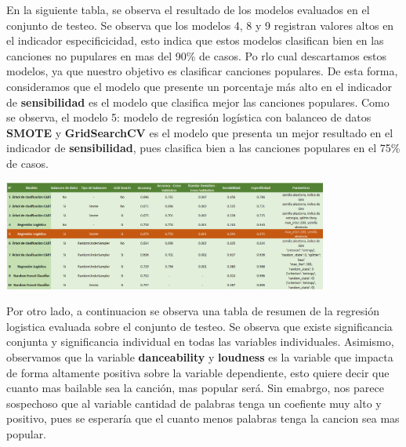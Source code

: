 \documentclass[
  letterpaper,
  DIV=11,
  numbers=noendperiod]{scrartcl}
\begin{document}
En la siguiente tabla, se observa el resultado de los modelos evaluados
en el conjunto de testeo. Se observa que los modelos 4, 8 y 9 registran
valores altos en el indicador especificicidad, esto indica que estos
modelos clasifican bien en las canciones no pupulares en mas del 90\% de
casos. Po rlo cual descartamos estos modelos, ya que nuestro objetivo es
clasificar canciones populares. De esta forma, consideramos que el
modelo que presente un porcentaje más alto en el indicador de
\textbf{sensibilidad} es el modelo que clasifica mejor las canciones
populares. Como se observa, el modelo 5: modelo de regresión logística
con balanceo de datos \textbf{SMOTE} y \textbf{GridSearchCV} es el
modelo que presenta un mejor resultado en el indicador de
\textbf{sensibilidad}, pues clasifica bien a las canciones populares en
el 75\% de casos.

\includegraphics[width=4.21in,height=\textheight]{comparacion-modelos.png}

Por otro lado, a continuacion se observa una tabla de resumen de la
regresión logistica evaluada sobre el conjunto de testeo. Se observa que
existe significancia conjunta y significancia individual en todas las
variables individuales. Asimismo, observamos que la variable
\textbf{danceability} y \textbf{loudness} es la variable que impacta de
forma altamente positiva sobre la variable dependiente, esto quiere
decir que cuanto mas bailable sea la canción, mas popular será. Sin
emabrgo, nos parece sospechoso que al variable cantidad de palabras
tenga un coefiente muy alto y positivo, pues se esperaría que el cuanto
menos palabras tenga la cancion sea mas popular.
\end{document}
